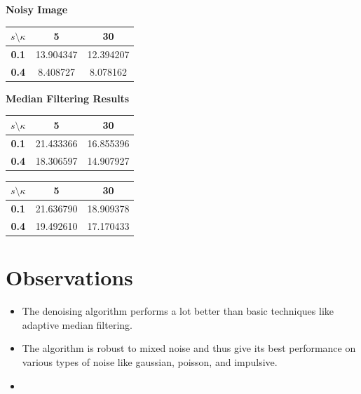 \documentclass{article}
\begin{document}
\textbf{Noisy Image}
\begin{table}[H]
    \begin{tabular}{|c|c|c|}
    \hline
    $ s \setminus \kappa$ & \textbf{5} & \textbf{30} \\
    \hline
    \textbf{0.1}          & 13.904347  & 12.394207    \\
    \hline
    \textbf{0.4}          & 8.408727  & 8.078162   \\
    \hline
    \end{tabular}
    \end{table}


\textbf{Median Filtering Results}
\begin{table}[H]
    \begin{tabular}{|c|c|c|}
    \hline
    $ s \setminus \kappa$ & \textbf{5} & \textbf{30} \\
    \hline
    \textbf{0.1}          & 21.433366  & 16.855396   \\
    \hline
    \textbf{0.4}          & 18.306597  & 14.907927 \\
    \hline
    \end{tabular}
    \end{table}

\begin{table}[H]
    \begin{tabular}{|c|c|c|}
    \hline
    $ s \setminus \kappa$ & \textbf{5} & \textbf{30} \\
    \hline
    \textbf{0.1}          & 21.636790  & 18.909378   \\
    \hline
    \textbf{0.4}          & 19.492610  & 17.170433  \\
    \hline
    \end{tabular}
    \end{table}


\section{Observations}

\begin{itemize}
    \item The denoising algorithm performs a lot better than basic techniques like adaptive median filtering. 
    \item The algorithm is robust to mixed noise and thus give its best performance on various types of noise like gaussian, poisson, and impulsive. 
    \item 
\end{itemize}
\end{document}
